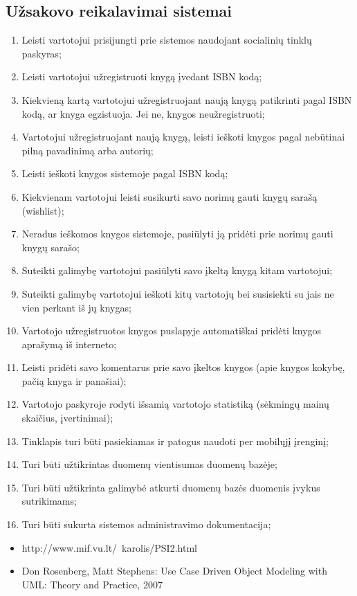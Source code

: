 \documentclass{VUMIFPSkursinis}
\begin{document}
\subsection{Užsakovo reikalavimai sistemai}
\begin{enumerate}
	\item Leisti vartotojui prisijungti prie sistemos naudojant socialinių tinklų paskyras;
	\item Leisti vartotojui užregistruoti knygą įvedant ISBN kodą;
	\item Kiekvieną kartą vartotojui užregistruojant naują knygą patikrinti pagal ISBN kodą,
		ar knyga egzistuoja. Jei ne, knygos neužregistruoti;
	\item Vartotojui užregistruojant naują knygą, leisti ieškoti knygos pagal 
		nebūtinai pilną pavadinimą arba autorių;
	\item Leisti ieškoti knygos sistemoje pagal ISBN kodą;
	\item Kiekvienam vartotojui leisti susikurti savo norimų gauti knygų sarašą (wishlist);
	\item Neradus ieškomos knygos sistemoje, pasiūlyti ją pridėti prie norimų gauti knygų sarašo;
	\item Suteikti galimybę vartotojui pasiūlyti savo įkeltą knygą kitam vartotojui;
	\item Suteikti galimybę vartotojui ieškoti kitų vartotojų bei susisiekti su jais ne vien
		perkant iš jų knygas;
	\item Vartotojo užregistruotos knygos puslapyje automatiškai pridėti knygos aprašymą
		iš interneto;
	\item Leisti pridėti savo komentarus prie savo įkeltos knygos (apie knygos kokybę,
		pačią knyga ir panašiai);
	\item Vartotojo paskyroje rodyti išsamią vartotojo statistiką (sėkmingų mainų skaičius,
		įvertinimai);
	\item Tinklapis turi būti pasiekiamas ir patogus naudoti per mobilųjį įrenginį;
	\item Turi būti užtikrintas duomenų vientisumas duomenų bazėje;
	\item Turi būti užtikrinta galimybė atkurti duomenų bazės duomenis įvykus sutrikimams;
	\item Turi būti sukurta sistemos administravimo dokumentacija;
\end{enumerate}


\setcounter{secnumdepth}{4}


	\begin{itemize}
		\item http://www.mif.vu.lt/~karolis/PSI2.html
		\item Don Rosenberg, Matt Stephens: Use Case Driven Object Modeling with UML: Theory and Practice, 2007
	\end{itemize}
\end{document}
